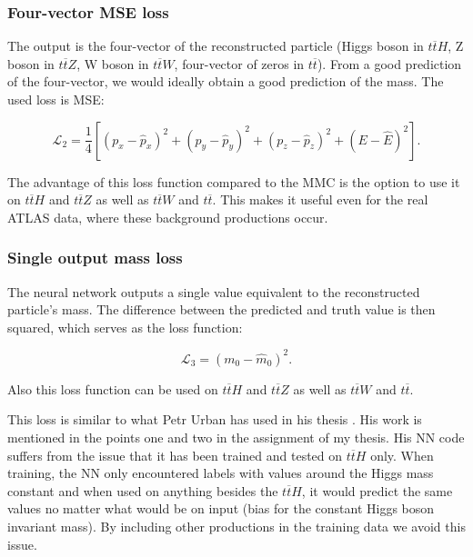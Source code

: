 \documentclass{ctuthesis}
\begin{document}


\subsubsection{Four-vector MSE loss}
The output is the four-vector of the reconstructed particle (Higgs boson in $t\overline{t}H$, Z boson in $t\overline{t}Z$, W boson in $t\overline{t}W$, four-vector of zeros in $t\overline{t}$). From a good prediction of the four-vector, we would ideally obtain a good prediction of the mass. The used loss is MSE:

\begin{equation}
\label{mse_higgs}
    \mathcal{L}_{2} = \frac{1}{4}[(p_{x}-\hat{p}_{x})^2 + (p_{y}-\hat{p}_{y})^2 + (p_{z}-\hat{p}_{z})^2 + (E-\hat{E})^2].
\end{equation}

The advantage of this loss function compared to the MMC is the option to use it on $t\overline{t}H$ and $t\overline{t}Z$ as well as $t\overline{t}W$ and $t\overline{t}$. This makes it useful even for the real ATLAS data, where these background productions occur.


\subsubsection{Single output mass loss}
The neural network outputs a single value equivalent to the reconstructed particle's mass. The difference between the predicted and truth value is then squared, which serves as the loss function:

\begin{equation}
\label{mass_loss}
    \mathcal{L}_{3} = (m_0-\hat{m}_0)^2.
\end{equation}

Also this loss function can be used on $t\overline{t}H$ and $t\overline{t}Z$ as well as $t\overline{t}W$ and $t\overline{t}$.

This loss is similar to what Petr Urban has used in his thesis \cite{decay_channel_image}. His work is mentioned in the points one and two in the assignment of my thesis. His NN code suffers from the issue that it has been trained and tested on $t\overline{t}H$ only. When training, the NN only encountered labels with values around the Higgs mass constant and when used on anything besides the $t\overline{t}H$, it would predict the same values no matter what would be on input (bias for the constant Higgs boson invariant mass). By including other productions in the training data we avoid this issue.
\end{document}
